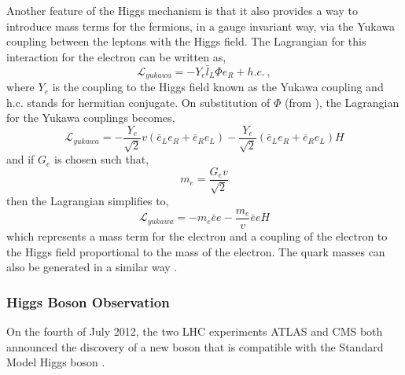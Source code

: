 Another feature of the Higgs mechanism is that it also provides a way to
introduce mass terms for the fermions, in a gauge invariant way, via the Yukawa
coupling between the leptons with the Higgs field. The Lagrangian for this
interaction for the electron can be written as, 
\begin{equation}
\mathcal{L}_{yukawa} = -Y_{e}\bar{l}_L\Phi e_R + h.c. \ ,
\end{equation}
where $Y_{e}$ is the coupling to the Higgs field known as the Yukawa coupling
and h.c. stands for hermitian conjugate. On substitution of $\Phi$ (from
), the Lagrangian for the Yukawa couplings becomes,
\begin{equation}
\mathcal{L}_{yukawa} = 
-\frac{Y_{e}}{\sqrt{2}} v
(\bar{e}_L e_R + \bar{e}_R e_L)
-\frac{Y_{e}}{\sqrt{2}}
(\bar{e}_L e_R + \bar{e}_R e_L)H
\end{equation}
and if $G_e$ is chosen such that,
\begin{equation}
m_{e} = \frac{G_{e}v}{\sqrt{2}}
\end{equation}
then the Lagrangian simplifies to,
\begin{equation}
\mathcal{L}_{yukawa} = 
- m_e \bar{e}e
- \frac{m_e}{v} \bar{e}e H
\end{equation}
which represents a mass term for the electron and a coupling of the electron to
the Higgs field proportional to the mass of the electron.
The quark masses can also be generated in a similar way \cite{halzen1984quarks,ral}.

\subsubsection{Higgs Boson Observation}
On the fourth of July 2012, the two LHC experiments ATLAS and CMS both announced
the discovery of a new boson that is compatible with the Standard Model Higgs
boson \cite{aad2012observation,chatrchyan2012observation}. 

